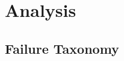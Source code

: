 \section{Analysis}
\label{sec:analysis}


\subsection{Failure Taxonomy}
\label{sec:failure-taxonomy}

